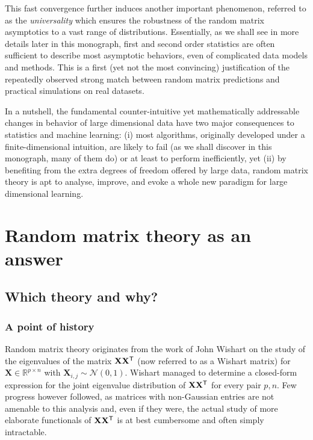 \documentclass[MAL,biber]{nowfnt} %
\newcommand{\T}{{\sf T}}
\newcommand{\X}{{\mathbf{X}}}
\newcommand{\RR}{{\mathbb{R}}}
\newcommand{\NN}{{\mathcal{N}}}
\begin{document}
This fast convergence further induces another important phenomenon, referred to as the \emph{universality} which ensures the robustness of the random matrix asymptotics to a vast range of distributions. Essentially, as we shall see in more details later in this monograph, first and second order statistics are often sufficient to describe most asymptotic behaviors, even of complicated data models and methods. This is a first (yet not the most convincing) justification of the repeatedly observed strong match between random matrix predictions and practical simulations on real datasets.

\medskip

In a nutshell, the fundamental counter-intuitive yet mathematically addressable changes in behavior of large dimensional data have two major consequences to statistics and machine learning: (i) most algorithms, originally developed under a finite-dimensional intuition, are likely to fail (as we shall discover in this monograph, many of them do) or at least to perform inefficiently, yet (ii) by benefiting from the extra degrees of freedom offered by large data, random matrix theory is apt to analyse, improve, and evoke a whole new paradigm for large dimensional learning.


\section{Random matrix theory as an answer}

\subsection{Which theory and why?}

\subsubsection{A point of history}
Random matrix theory originates from the work of John Wishart \citep{wishart1928generalised} on the study of the eigenvalues of the matrix $\X\X^\T$ (now referred to as a Wishart matrix) for $\X\in\RR^{p\times n}$ with $\X_{i,j}\sim\NN(0,1)$. Wishart managed to determine a closed-form expression for the joint eigenvalue distribution of $\X\X^\T$ for every pair $p,n$. Few progress however followed, as matrices with non-Gaussian entries are not amenable to this analysis and, even if they were, the actual study of more elaborate functionals of $\X\X^\T$ is at best cumbersome and often simply intractable.
\end{document}
